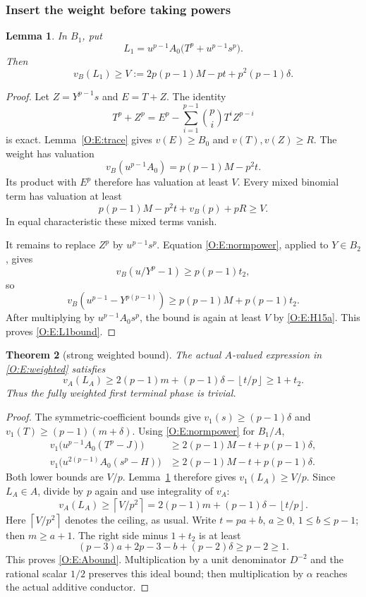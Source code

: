 \documentclass[11pt]{amsart}
\newtheorem{theorem}{Theorem}[section]
\newtheorem{lemma}[theorem]{Lemma}
\theoremstyle{definition}
\theoremstyle{remark}
\newcommand{\ceil}[1]{\left\lceil #1\right\rceil}
\newcommand{\floor}[1]{\left\lfloor #1\right\rfloor}
\begin{document}
\subsubsection*{Insert the weight before taking powers}
\begin{lemma}\label{O:E:power}
In $B_1$, put
\[
 L_1=u^{p-1}A_0\bigl(T^p+u^{p-1}s^p\bigr).
\]
Then
\begin{equation}\label{O:E:L1bound}
 v_B(L_1)\ge V:=2p(p-1)M-pt+p^2(p-1)\delta.
\end{equation}
\end{lemma}
\begin{proof}
Let $Z=Y^{p-1}s$ and $E=T+Z$. The identity
\[
 T^p+Z^p=E^p-\sum_{i=1}^{p-1}\binom pi T^iZ^{p-i}
\]
is exact. Lemma~\ref{O:E:trace} gives $v(E)\ge B_0$ and
$v(T),v(Z)\ge R$. The weight has valuation
\[
 v_B(u^{p-1}A_0)=p(p-1)M-p^2t.
\]
Its product with $E^p$ therefore has valuation at least $V$.
Every mixed binomial term has valuation at least
\[
 p(p-1)M-p^2t+v_B(p)+pR\ge V.
\]
In equal characteristic these mixed terms vanish.

It remains to replace $Z^p$ by $u^{p-1}s^p$.
Equation \eqref{O:E:normpower}, applied to $Y\in B_2$, gives
\[
 v_B(u/Y^p-1)\ge p(p-1)t_2,
\]
so
\[
 v_B(u^{p-1}-Y^{p(p-1)})
   \ge p(p-1)M+p(p-1)t_2.
\]
After multiplying by $u^{p-1}A_0s^p$, the bound is again at least
$V$ by \eqref{O:E:H15a}. This proves \eqref{O:E:L1bound}.
\end{proof}

\begin{theorem}[strong weighted bound]\label{O:E:main}
The actual $A$-valued expression in \eqref{O:E:weighted} satisfies
\begin{equation}\label{O:E:Abound}
 v_A(L_A)\ge2(p-1)m+(p-1)\delta-\floor{t/p}\ge1+t_2.
\end{equation}
Thus the fully weighted first terminal phase is trivial.
\end{theorem}
\begin{proof}
The symmetric-coefficient bounds give
$v_1(s)\ge(p-1)\delta$ and $v_1(T)\ge(p-1)(m+\delta)$.
Using \eqref{O:E:normpower} for $B_1/A$,
\begin{align*}
 v_1\bigl(u^{p-1}A_0(T^p-J)\bigr)
   &\ge2(p-1)M-t+p(p-1)\delta,\\
 v_1\bigl(u^{2(p-1)}A_0(s^p-H)\bigr)
   &\ge2(p-1)M-t+p(p-1)\delta.
\end{align*}
Both lower bounds are $V/p$. Lemma~\ref{O:E:power} therefore gives
$v_1(L_A)\ge V/p$.
Since $L_A\in A$, divide by $p$ again and use integrality of $v_A$:
\[
 v_A(L_A)\ge\ceil{V/p^2}
  =2(p-1)m+(p-1)\delta-\floor{t/p}.
\]
Here $\ceil{V/p^2}$ denotes the ceiling, as usual.
Write $t=pa+b$, $a\ge0$, $1\le b\le p-1$; then $m\ge a+1$.
The right side minus $1+t_2$ is at least
\[
 (p-3)a+2p-3-b+(p-2)\delta\ge p-2\ge1.
\]
This proves \eqref{O:E:Abound}. Multiplication by a unit denominator
$D^{-2}$ and the rational scalar $1/2$ preserves this ideal bound;
then multiplication by $\alpha$ reaches the actual additive conductor.
\end{proof}
\end{document}

